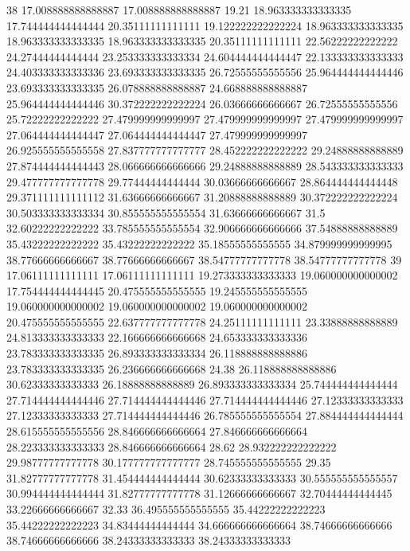 38 17.008888888888887 17.008888888888887 19.21 18.963333333333335 17.744444444444444 20.35111111111111 19.122222222222224 18.963333333333335 18.963333333333335 18.963333333333335 20.35111111111111 22.56222222222222 24.27444444444444 23.253333333333334 24.604444444444447 22.133333333333333 24.403333333333336 23.693333333333335 26.72555555555556 25.964444444444446 23.693333333333335 26.078888888888887 24.668888888888887 25.964444444444446 30.372222222222224 26.03666666666667 26.72555555555556 25.72222222222222 27.479999999999997 27.479999999999997 27.479999999999997 27.064444444444447 27.064444444444447 27.479999999999997 26.925555555555558 27.837777777777777 28.452222222222222 29.24888888888889 27.874444444444443 28.066666666666666 29.24888888888889 28.543333333333333 29.477777777777778 29.77444444444444 30.03666666666667 28.864444444444448 29.371111111111112 31.63666666666667 31.20888888888889 30.372222222222224 30.503333333333334 30.855555555555554 31.63666666666667 31.5 32.60222222222222 33.785555555555554 32.906666666666666 37.54888888888889 35.43222222222222 35.43222222222222 35.18555555555555 34.879999999999995 38.77666666666667 38.77666666666667 38.54777777777778 38.54777777777778
39 17.06111111111111 17.06111111111111 19.273333333333333 19.060000000000002 17.754444444444445 20.475555555555555 19.245555555555555 19.060000000000002 19.060000000000002 19.060000000000002 20.475555555555555 22.637777777777778 24.25111111111111 23.33888888888889 24.813333333333333 22.166666666666668 24.653333333333336 23.783333333333335 26.893333333333334 26.118888888888886 23.783333333333335 26.236666666666668 24.38 26.118888888888886 30.62333333333333 26.18888888888889 26.893333333333334 25.744444444444444 27.714444444444446 27.714444444444446 27.714444444444446 27.12333333333333 27.12333333333333 27.714444444444446 26.785555555555554 27.884444444444444 28.615555555555556 28.846666666666664 27.846666666666664 28.223333333333333 28.846666666666664 28.62 28.932222222222222 29.98777777777778 30.177777777777777 28.745555555555555 29.35 31.82777777777778 31.454444444444444 30.62333333333333 30.555555555555557 30.994444444444444 31.82777777777778 31.12666666666667 32.70444444444445 33.22666666666667 32.33 36.495555555555555 35.44222222222223 35.44222222222223 34.83444444444444 34.666666666666664 38.74666666666666 38.74666666666666 38.24333333333333 38.24333333333333
